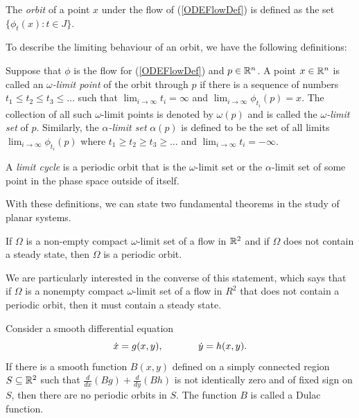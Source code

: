 \documentclass[12pt]{UOthesis}
\theoremstyle{remarkstyle}
\begin{document}
\begin{defn}
	The \emph{orbit} of a point $x$ under the flow of (\ref{ODEFlowDef}) is defined as the set $\{\phi_t(x)\colon t\in J\}.$
	\label{DefOrbit}
\end{defn}

To describe the limiting behaviour of an orbit, we have the following definitions:

\begin{defn}
	Suppose that $\phi$ is the flow for (\ref{ODEFlowDef}) and $p\in \mathbb R^n$. A point $x\in \mathbb R^n$ is called an \emph{$\omega$-limit point} of the orbit through $p$ if there is a sequence of numbers $t_1\le t_2\le t_3\le \ldots$ such that $\lim_{i\rightarrow\infty}t_i=\infty$ and $\lim_{i\rightarrow\infty}\phi_{t_i}(p)=x$. The collection of all such $\omega$-limit points is denoted by $\omega(p)$ and is called the \emph{$\omega$-limit set} of $p$. Similarly, the \emph{$\alpha$-limit set} $\alpha(p)$ is defined to be the set of all limits $\lim_{i\rightarrow\infty} \phi_{t_i}(p)$ where $t_1\ge t_2\ge t_3\ge\ldots$ and $\lim_{i\rightarrow\infty}t_i=-\infty$.
	\label{DefOmegaAlphaSet}
\end{defn}

\begin{defn}
	A \emph{limit cycle} is a periodic orbit that is the $\omega$-limit set or the $\alpha$-limit set of some point in the phase space outside of itself.
	\label{DefLimitCycle}
\end{defn}

With these definitions, we can state two fundamental theorems in the study of planar systems.

\begin{theo}
	If $\Omega$ is a non-empty compact $\omega$-limit set of a flow in $\mathbb R^2$ and if $\Omega$ does not contain a steady state, then $\Omega$ is a periodic orbit.
	\label{TheoPoincareBendixson}
\end{theo}
We are particularly interested in the converse of this statement, which says that if $\Omega$ is a nonempty compact $\omega$-limit set of a flow in $R^2$ that does not contain a periodic orbit, then it must contain a steady state.\\

\begin{theo}
	Consider a smooth differential equation 
	$$\dot{x}=g(x,y),\hspace{0.5in} \dot{y}=h(x,y).$$
	If there is a smooth function $B(x,y)$ defined on a simply connected region $S\subseteq\mathbb R^2$ such that $\frac{d}{dx}(Bg)+\frac{d}{dy}(Bh)$ is not identically zero and of fixed sign on $S$, then there are no periodic orbits in $S$. The function $B$ is called a Dulac function.
	\label{TheoBendixsonDulac}
\end{theo}
\end{document}

